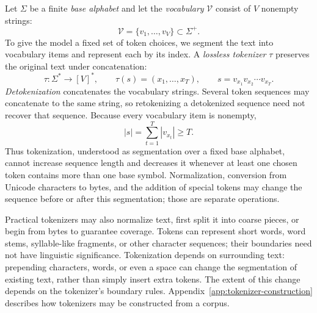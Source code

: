 \documentclass[11pt,twoside]{article}
\theoremstyle{plain}
\theoremstyle{definition}
\theoremstyle{remark}
\begin{document}
Let $\Sigma$ be a finite \emph{base alphabet} and let the \emph{vocabulary} $\mathcal V$
consist of $V$ nonempty strings:
\begin{equation}
\mathcal V=\{v_1,\ldots,v_V\}\subset\Sigma^+.
\end{equation}
To give the model a fixed set of token
choices, we segment the text into vocabulary items and represent each by its
index. A \emph{lossless tokenizer} $\tau$ preserves the original text under concatenation:
\begin{equation}
\tau:\Sigma^*\longrightarrow[V]^*,
\qquad
\tau(s)=(x_1,\ldots,x_T),
\qquad
s=v_{x_1}v_{x_2}\cdots v_{x_T}.
\label{eq:tokenizer}
\end{equation}
\emph{Detokenization} concatenates the vocabulary strings. Several token sequences
may concatenate to the same string, so retokenizing a detokenized sequence
need not recover that sequence. Because every vocabulary item is nonempty,
\begin{equation}
|s|=\sum_{t=1}^T|v_{x_t}|\geq T.
\label{eq:token-length}
\end{equation}
Thus tokenization, understood as segmentation over a fixed base alphabet,
cannot increase sequence length and decreases it whenever at least one chosen
token contains more than one base symbol. Normalization, conversion from
Unicode characters to bytes, and the addition of special tokens may change
the sequence before or after this segmentation; those are separate operations.

Practical tokenizers may also normalize text, first split it into coarse
pieces, or begin from bytes to guarantee coverage. Tokens can represent short
words, word stems, syllable-like fragments, or other character sequences;
their boundaries need not have linguistic significance. Tokenization depends
on surrounding text: prepending characters, words, or even a space can change
the segmentation of existing text, rather than simply insert extra tokens.
The extent of this change depends on the tokenizer's boundary rules.
Appendix~\ref{app:tokenizer-construction} describes how tokenizers may be
constructed from a corpus.
\end{document}
